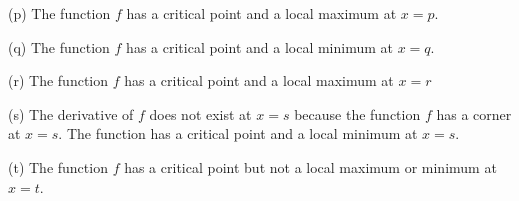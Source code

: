 \documentclass{ximera}
\begin{document}
\begin{problem}


\begin{explanation}


(p) The function $f$ has a critical point and a local maximum at $x=p$.  

(q) The function $f$ has a critical point and a local minimum at $x=q$.

(r) The function $f$ has a critical point and a local maximum at $x=r$

(s) The derivative of $f$ does not exist at $x=s$ because the function $f$ has a corner at $x=s$.  The function has a critical point and a local minimum at $x=s$.

(t) The function $f$ has a critical point but not a local maximum or minimum at $x=t$.


		\end{explanation}	
		
\end{problem}
\end{document}
